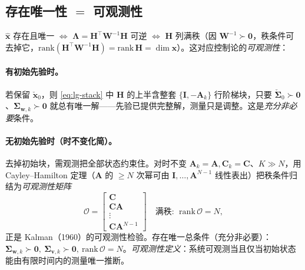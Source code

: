 \subsection{存在唯一性 \texorpdfstring{$=$}{=} 可观测性}
\label{sec:est-observability}

$\hat{\mathbf{x}}$ 存在且唯一 $\iff$ $\boldsymbol{\Lambda}=\mathbf{H}^\top\mathbf{W}^{-1}\mathbf{H}$ 可逆 $\iff$ $\mathbf{H}$ 列满秩（因 $\mathbf{W}^{-1}\succ\mathbf{0}$，秩条件可去掉它，$\mathrm{rank}(\mathbf{H}^\top\mathbf{W}^{-1}\mathbf{H})=\mathrm{rank}\,\mathbf{H}=\dim\mathbf{x}$）。这对应控制论的\emph{可观测性}\cite{barfoot2024state}：

\paragraph{有初始先验时。}
若保留 $\check{\mathbf{x}}_0$，则 \cref{eq:lg-stack} 中 $\mathbf{H}$ 的上半含整套 $\{\mathbf{I},-\mathbf{A}_k\}$ 行阶梯块，只要 $\check{\boldsymbol{\Sigma}}_0\succ\mathbf{0}$、$\boldsymbol{\Sigma}_{\mathbf{w},k}\succ\mathbf{0}$ 就总有唯一解——先验已提供完整解，测量只是调整。这是\emph{充分非必要}条件。

\paragraph{无初始先验时（时不变化简）。}
去掉初始块，需观测把全部状态约束住。对时不变 $\mathbf{A}_k=\mathbf{A},\mathbf{C}_k=\mathbf{C}$、$K\gg N$，用 Cayley–Hamilton 定理（$\mathbf{A}$ 的 $\ge N$ 次幂可由 $\mathbf{I},\dots,\mathbf{A}^{N-1}$ 线性表出）把秩条件归结为\emph{可观测性矩阵}
\begin{equation}
  \mathcal{O}=\begin{bmatrix}\mathbf{C}\\\mathbf{C}\mathbf{A}\\\vdots\\\mathbf{C}\mathbf{A}^{N-1}\end{bmatrix}\quad\text{满秩}:\ \ \mathrm{rank}\,\mathcal{O}=N,
  \label{eq:observability}
\end{equation}
正是 Kalman（1960）的可观测性检验。存在唯一总条件（充分非必要）：$\boldsymbol{\Sigma}_{\mathbf{w},k}\succ\mathbf{0},\ \boldsymbol{\Sigma}_{\mathbf{v},k}\succ\mathbf{0},\ \mathrm{rank}\,\mathcal{O}=N$。\emph{可观测性定义}：系统可观测当且仅当初始状态能由有限时间内的测量唯一推断。

